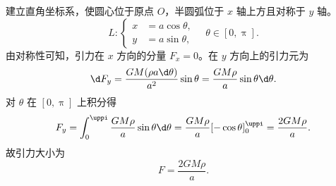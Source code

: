 \begin{solution}
    建立直角坐标系，使圆心位于原点 $O$，半圆弧位于 $x$ 轴上方且对称于 $y$ 轴。
    \begin{equation}
        L: \left\{ \begin{aligned} x &= a \cos \theta, \\ y &= a \sin \theta, \end{aligned} \right. \quad \theta \in [0, \uppi].
    \end{equation}
    由对称性可知，引力在 $x$ 方向的分量 $F_x = 0$。在 $y$ 方向上的引力元为
    \begin{equation}
        \d F_y = \frac{G M (\rho a \d \theta)}{a^2} \sin \theta = \frac{G M \rho}{a} \sin \theta \d \theta.
    \end{equation}
    对 $\theta$ 在 $[0, \uppi]$ 上积分得
    \begin{equation}
        F_y = \int_{0}^{\uppi} \frac{G M \rho}{a} \sin \theta \d \theta = \frac{G M \rho}{a} [-\cos \theta]_{0}^{\uppi} = \frac{2 G M \rho}{a}.
    \end{equation}
    故引力大小为
    \begin{equation}
        \boxed{F = \frac{2 G M \rho}{a}}.
    \end{equation}
\end{solution}

\endinput
